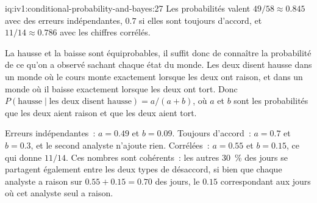 \begin{solution}{iq:iv1:conditional-probability-and-bayes:27}
Les probabilités valent $49/58 \approx 0.845$ avec des erreurs indépendantes, $0.7$ si elles sont toujours d'accord, et $11/14 \approx 0.786$ avec les chiffres corrélés.

La hausse et la baisse sont équiprobables, il suffit donc de connaître la probabilité de ce qu'on a observé sachant chaque état du monde. Les deux disent hausse dans un monde où le cours monte exactement lorsque les deux ont raison, et dans un monde où il baisse exactement lorsque les deux ont tort. Donc $P(\text{hausse} \mid \text{les deux disent hausse}) = a/(a + b)$, où $a$ et $b$ sont les probabilités que les deux aient raison et que les deux aient tort.

Erreurs indépendantes~: $a = 0.49$ et $b = 0.09$. Toujours d'accord~: $a = 0.7$ et $b = 0.3$, et le second analyste n'ajoute rien. Corrélées~: $a = 0.55$ et $b = 0.15$, ce qui donne $11/14$. Ces nombres sont cohérents~: les autres 30~\% des jours se partagent également entre les deux types de désaccord, si bien que chaque analyste a raison sur $0.55 + 0.15 = 0.70$ des jours, le $0.15$ correspondant aux jours où cet analyste seul a raison.

\end{solution}

